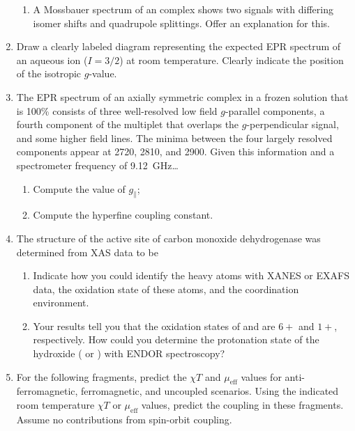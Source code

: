 \documentclass[../psets.tex]{subfiles}
\begin{document}
\begin{enumerate}
\begin{enumerate}
        \item A Mossbauer spectrum of an  complex shows two signals with differing isomer shifts and quadrupole splittings. Offer an explanation for this.
    \end{enumerate}
    \item Draw a clearly labeled diagram representing the expected EPR spectrum of an aqueous  ion ($I=3/2$) at room temperature. Clearly indicate the position of the isotropic $g$-value.
    \item The EPR spectrum of an axially symmetric  complex in a frozen solution that is 100\%  consists of three well-resolved low field $g$-parallel components, a fourth component of the multiplet that overlaps the $g$-perpendicular signal, and some higher field lines. The minima between the four largely resolved components appear at \SI{2720}{\gauss}, \SI{2810}{\gauss}, and \SI{2900}{\gauss}. Given this information and a spectrometer frequency of \SI{9.12}{\giga\hertz}\dots
    \begin{enumerate}
        \item Compute the value of $g_\parallel$;
        \item Compute the hyperfine coupling constant.
    \end{enumerate}
    \item The structure of the active site of carbon monoxide dehydrogenase was determined from XAS data to be
    \begin{center}
        \footnotesize
    \end{center}
    \begin{enumerate}
        \item Indicate how you could identify the heavy atoms with XANES or EXAFS data, the oxidation state of these atoms, and the coordination environment.
        \item Your results tell you that the oxidation states of  and  are $6+$ and $1+$, respectively. How could you determine the protonation state of the hydroxide ( or ) with ENDOR spectroscopy?
    \end{enumerate}
    \item For the following fragments, predict the $\chi T$ and $\mu_\text{eff}$ values for anti-ferromagnetic, ferromagnetic, and uncoupled scenarios. Using the indicated room temperature $\chi T$ or $\mu_\text{eff}$ values, predict the coupling in these fragments. Assume no contributions from spin-orbit coupling.

\end{enumerate}
\end{document}
